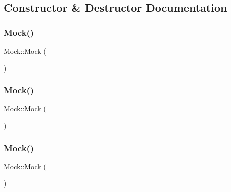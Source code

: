 \subsection{Constructor \& Destructor Documentation}
\mbox{\label{class_mock_a2b9528f2e7fcf9738201a5ea667c1998}} 
\subsubsection{\texorpdfstring{Mock()}{Mock()}\hspace{0.1cm}{\footnotesize\ttfamily [1/6]}}
{\footnotesize\ttfamily Mock\+::\+Mock (\begin{DoxyParamCaption}{ }\end{DoxyParamCaption})\hspace{0.3cm}{\ttfamily [inline]}}

\mbox{\label{class_mock_a2b9528f2e7fcf9738201a5ea667c1998}} 
\subsubsection{\texorpdfstring{Mock()}{Mock()}\hspace{0.1cm}{\footnotesize\ttfamily [2/6]}}
{\footnotesize\ttfamily Mock\+::\+Mock (\begin{DoxyParamCaption}{ }\end{DoxyParamCaption})\hspace{0.3cm}{\ttfamily [inline]}}

\mbox{\label{class_mock_a2b9528f2e7fcf9738201a5ea667c1998}} 
\subsubsection{\texorpdfstring{Mock()}{Mock()}\hspace{0.1cm}{\footnotesize\ttfamily [3/6]}}
{\footnotesize\ttfamily Mock\+::\+Mock (\begin{DoxyParamCaption}{ }\end{DoxyParamCaption})\hspace{0.3cm}{\ttfamily [inline]}}

\mbox{\label{class_mock_a2b9528f2e7fcf9738201a5ea667c1998}} 
